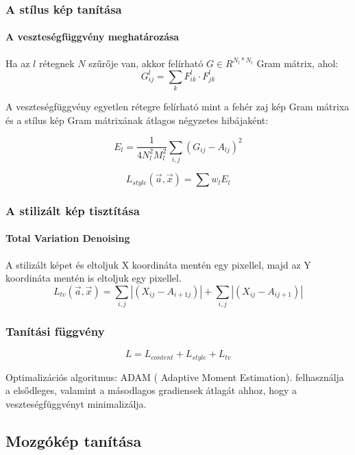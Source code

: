 \documentclass{beamer}
\begin{document}
	\begin{frame}
		\frametitle{A stílus kép tanítása}
		\framesubtitle{A veszteségfüggvény meghatározása}
		
		Ha az \(l\) rétegnek \(N\) szűrője van, akkor felírható \(G \in R^{N_l*N_l}\) Gram mátrix, ahol:
		\begin{equation}
			G^l_{ij} = \sum_{k} F^l_{ik} \cdot F^l_{jk}
		\end{equation}
		
		A veszteségfüggvény egyetlen rétegre felírható mint a fehér zaj kép Gram mátrixa és a stílus kép Gram mátrixának átlagos négyzetes hibájaként:
		 
		\begin{equation}
			E_l = \frac{1}{4N^2_l M^2_l} \sum_{i,j} (G_{ij} - A_{lj})^2
		\end{equation}
		
		\begin{equation}
			L_{style}(\vec{a}, \vec{x}) = \sum w_lE_l
		\end{equation}
		
	\end{frame}

	\begin{frame}
		\frametitle{A stilizált kép tisztítása}
		\framesubtitle{Total Variation Denoising}
		
		A stilizált képet és eltoljuk X koordináta mentén egy pixellel, majd az Y koordináta mentén is eltoljuk egy pixellel.
		\begin{equation}
			L_{tv}(\vec{a}, \vec{x}) = \sum_{i,j} \left|(X_{ij} - A_{{i+1}j})\right| + \sum_{i, j} \left|(X_{ij} - A_{i {j+1}})\right|
		\end{equation}
	\end{frame}

	\begin{frame}
		\frametitle{Tanítási függvény}
		
		\begin{equation}
			L = L_{content} + L_{style} + L_{tv}
		\end{equation}
		
		Optimalizációs algoritmus: ADAM ( Adaptive Moment Estimation). felhasználja a elsődleges, valamint a másodlagos gradiensek átlagát ahhoz, hogy a veszteségfüggvényt minimalizálja.
		
	\end{frame}

	\subsection{Mozgókép tanítása}
	
\end{document}
